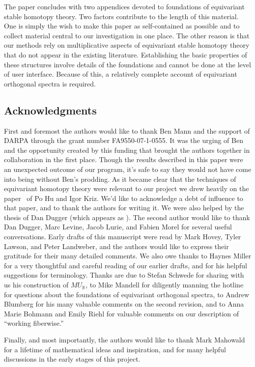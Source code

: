 \documentclass{amsart}
\theoremstyle{definition}
\theoremstyle{remark}
\newcommand{\R}{{\mathbb R}}
\newcommand{\mur}{MU_{\R}}
\begin{document}
The paper concludes with two appendices devoted to
foundations of equivariant stable homotopy theory.  Two factors
contribute to the length of this material.  One is simply the wish to
make this paper as self-contained as possible and to collect material
central to our investigation in one place.  The other reason is that our
methods rely on multiplicative aspects of equivariant stable
homotopy theory that do not appear in the existing literature.
Establishing the basic properties of these structures involve details
of the foundations and cannot be done at the level of user interface.
Because of this, a relatively complete account of equivariant
orthogonal spectra is required.  


\subsection{Acknowledgments} First and foremost the authors would like
to thank Ben Mann and the support of DARPA through the grant number
FA9550-07-1-0555.  It was the urging of Ben and the opportunity
created by this funding that brought the authors together in
collaboration in the first place.  Though the results described in
this paper were an unexpected outcome of our program, it's safe to say
they would not have come into being without Ben's prodding.  As it
became clear that the techniques of equivariant homotopy theory were
relevant to our project we drew heavily on the paper~\cite{MR1808224}
of Po Hu and Igor Kriz.  We'd like to acknowledge a debt of influence
to that paper, and to thank the authors for writing it.  We were also
helped by the thesis of Dan Dugger (which appears as
\cite{MR2240234}).  The second author would like to thank Dan Dugger,
Marc Levine, Jacob Lurie, and Fabien Morel for several useful
conversations.  Early drafts of this manuscript were read by Mark
Hovey, Tyler Lawson, and Peter Landweber, and the authors would like
to express their gratitude for their many detailed comments.  We also
owe thanks to Haynes Miller for a very thoughtful and careful reading
of our earlier drafts, and for his helpful suggestions for
terminology.  Thanks are due to Stefan Schwede for sharing with us his
construction of $\mur$, to Mike Mandell for diligently manning the
hotline for questions about the foundations of equivariant orthogonal
spectra, to Andrew Blumberg for his many valuable comments on the
second revision, and to Anna Marie Bohmann and Emily Riehl for
valuable comments on our description of ``working fiberwise.''

Finally, and most importantly, the authors would like to thank Mark
Mahowald for a lifetime of mathematical ideas and inspiration, and for
many helpful discussions in the early stages of this project.
\end{document}
